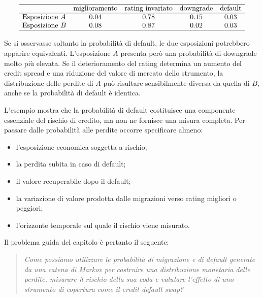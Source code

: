 \[
\begin{array}{lcccc}
\hline
&
\text{miglioramento}
&
\text{rating invariato}
&
\text{downgrade}
&
\text{default}
\\
\hline
\text{Esposizione }A
&
0.04
&
0.78
&
0.15
&
0.03
\\
\text{Esposizione }B
&
0.08
&
0.87
&
0.02
&
0.03
\\
\hline
\end{array}
\]

Se si osservasse soltanto la probabilit\`{a} di default, le due
esposizioni potrebbero apparire equivalenti. L'esposizione $A$
presenta per\`{o} una probabilit\`{a} di downgrade molto pi\`{u}
elevata. Se il deterioramento del rating determina un aumento del
credit spread e una riduzione del valore di mercato dello strumento,
la distribuzione delle perdite di $A$ pu\`{o} risultare sensibilmente
diversa da quella di $B$, anche se la probabilit\`{a} di default
\`{e} identica.

L'esempio mostra che la probabilit\`{a} di default costituisce una
componente essenziale del rischio di credito, ma non ne fornisce una
misura completa. Per passare dalle probabilit\`{a} alle perdite occorre
specificare almeno:

\begin{itemize}

\item l'esposizione economica soggetta a rischio;

\item la perdita subita in caso di default;

\item il valore recuperabile dopo il default;

\item la variazione di valore prodotta dalle migrazioni verso rating
migliori o peggiori;

\item l'orizzonte temporale sul quale il rischio viene misurato.

\end{itemize}

Il problema guida del capitolo \`{e} pertanto il seguente:

\begin{quote}
\emph{Come possiamo utilizzare le probabilit\`{a} di migrazione e di
default generate da una catena di Markov per costruire una
distribuzione monetaria delle perdite, misurare il rischio della sua
coda e valutare l'effetto di uno strumento di copertura come il credit
default swap?}
\end{quote}

